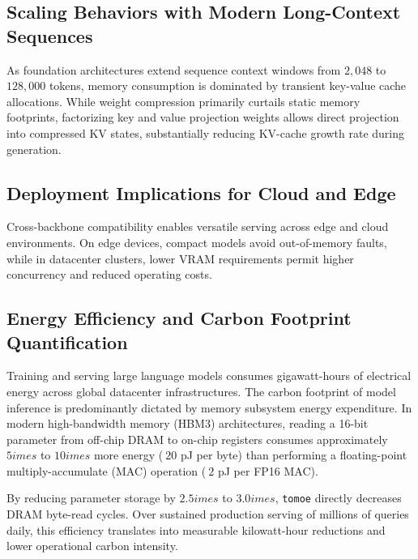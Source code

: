 \subsection{Scaling Behaviors with Modern Long-Context Sequences}
As foundation architectures extend sequence context windows from $2{,}048$ to $128{,}000$ tokens, memory consumption is dominated by transient key-value cache allocations. While weight compression primarily curtails static memory footprints, factorizing key and value projection weights allows direct projection into compressed KV states, substantially reducing KV-cache growth rate during generation.

\subsection{Deployment Implications for Cloud and Edge}
Cross-backbone compatibility enables versatile serving across edge and cloud environments. On edge devices, compact models avoid out-of-memory faults, while in datacenter clusters, lower VRAM requirements permit higher concurrency and reduced operating costs.

\subsection{Energy Efficiency and Carbon Footprint Quantification}
Training and serving large language models consumes gigawatt-hours of electrical energy across global datacenter infrastructures. The carbon footprint of model inference is predominantly dictated by memory subsystem energy expenditure. In modern high-bandwidth memory (HBM3) architectures, reading a 16-bit parameter from off-chip DRAM to on-chip registers consumes approximately $5	imes$ to $10	imes$ more energy ($~20$ pJ per byte) than performing a floating-point multiply-accumulate (MAC) operation ($~2$ pJ per FP16 MAC).

By reducing parameter storage by $2.5	imes$ to $3.0	imes$, \texttt{tomoe} directly decreases DRAM byte-read cycles. Over sustained production serving of millions of queries daily, this efficiency translates into measurable kilowatt-hour reductions and lower operational carbon intensity.
